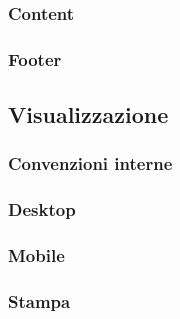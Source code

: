\subsubsection{Content}
\label{ssub:content}

\subsubsection{Footer}
\label{ssub:footer}
\subsection{Visualizzazione} %
\label{sub:visualizzazione}
\subsubsection{Convenzioni interne}
\label{ssub:convenzioni_interne}

\subsubsection{Desktop}
\label{ssub:desktop}

\subsubsection{Mobile}
\label{ssub:mobile}

\subsubsection{Stampa}
\label{ssub:stampa}

